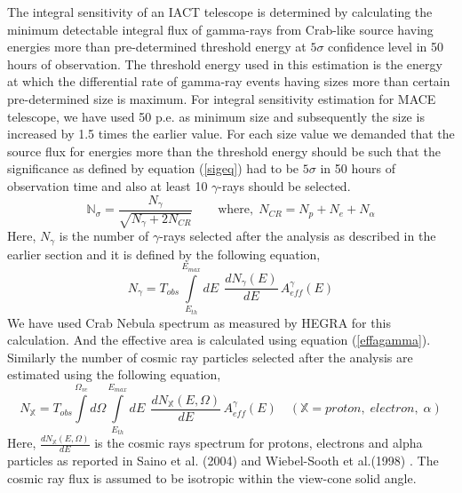 \documentclass[preprint,12pt]{elsarticle}
\begin{document}
\noindent 
The integral sensitivity of an IACT telescope is determined by calculating the 
minimum detectable integral flux of gamma-rays from Crab-like source having energies more 
than pre-determined threshold energy at $5\sigma$ confidence level in 50 hours of observation.
The threshold energy used in this estimation is the energy at which the differential  
rate of gamma-ray events having sizes more than certain pre-determined size is maximum.  
For integral sensitivity estimation for MACE telescope, we have used 50 p.e. as minimum size and 
subsequently the size is increased by 1.5 times the earlier value. For each size value we 
demanded that the source flux for energies more than the threshold energy should be such 
that the significance as defined by equation (\ref{sigeq}) had to be $5\sigma$ in 50 hours of observation time 
and also at least 10 $\gamma$-rays should be selected.
\begin{equation}\label{sigeq}
	\mathbb{N}_\sigma = \frac{N_\gamma}{\sqrt{N_\gamma+2N_{CR}}} 
	\quad\quad \mathrm{where,}\; N_{CR} = N_p+N_e+N_\alpha
\end{equation}
Here, $N_\gamma$ is the number of $\gamma$-rays selected after the analysis as described in 
the earlier section and it is defined by the following equation,
\begin{equation}
	N_\gamma = T_{obs} \int\limits_{E_{th}}^{E_{max}} dE \;\, \frac{dN_\gamma (E)}{dE} \, A_{eff}^\gamma(E)
\end{equation}
We have used Crab Nebula spectrum as measured by HEGRA \cite{crabHEGRA} for this calculation.
And the effective area is calculated using equation (\ref{effagamma}). 
Similarly the number of cosmic ray particles selected after the analysis are estimated using
the following equation,
\begin{equation}
	N_{\mathbb{X}} = T_{obs} \int\limits^{\Omega_{vc}} d\Omega
	\int\limits_{E_{th}}^{E_{max}} dE \;\, 
	\frac{dN_{\mathbb{X}}(E,\Omega)}{dE} \, A_{eff}^\gamma(E) 
	\quad ({\mathbb{X}} = proton,\; electron,\; \alpha)
\end{equation}
Here, $\frac{dN_{\mathbb{X}}(E,\Omega)}{dE}$ is the cosmic rays spectrum for protons, 
electrons and alpha particles  as reported in Saino et al. (2004) \cite{spectraCosmic1} and Wiebel-Sooth et al.(1998) \cite{spectraCosmic2}.
The cosmic ray flux is assumed to be isotropic within the  view-cone solid angle. 
\end{document}
